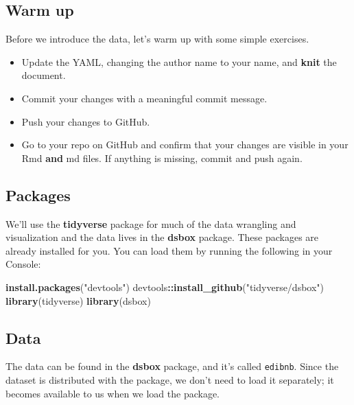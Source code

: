 \documentclass[
]{article}
\newenvironment{Shaded}{\begin{snugshade}}{\end{snugshade}}
\newcommand{\FunctionTok}[1]{\textcolor[rgb]{0.13,0.29,0.53}{\textbf{#1}}}
\newcommand{\NormalTok}[1]{#1}
\newcommand{\SpecialCharTok}[1]{\textcolor[rgb]{0.81,0.36,0.00}{\textbf{#1}}}
\newcommand{\StringTok}[1]{\textcolor[rgb]{0.31,0.60,0.02}{#1}}
\providecommand{\tightlist}{%
  \setlength{\itemsep}{0pt}\setlength{\parskip}{0pt}}
\begin{document}
\subsection{Warm up}\label{warm-up}

Before we introduce the data, let's warm up with some simple exercises.

\begin{itemize}
\tightlist
\item
  Update the YAML, changing the author name to your name, and
  \textbf{knit} the document.
\item
  Commit your changes with a meaningful commit message.
\item
  Push your changes to GitHub.
\item
  Go to your repo on GitHub and confirm that your changes are visible in
  your Rmd \textbf{and} md files. If anything is missing, commit and
  push again.
\end{itemize}

\subsection{Packages}\label{packages}

We'll use the \textbf{tidyverse} package for much of the data wrangling
and visualization and the data lives in the \textbf{dsbox} package.
These packages are already installed for you. You can load them by
running the following in your Console:

\begin{Shaded}
\begin{Highlighting}[]
\FunctionTok{install.packages}\NormalTok{(}\StringTok{"devtools"}\NormalTok{)}
\NormalTok{devtools}\SpecialCharTok{::}\FunctionTok{install\_github}\NormalTok{(}\StringTok{"tidyverse/dsbox"}\NormalTok{)}
\FunctionTok{library}\NormalTok{(tidyverse)}
\FunctionTok{library}\NormalTok{(dsbox)}
\end{Highlighting}
\end{Shaded}

\subsection{Data}\label{data}

The data can be found in the \textbf{dsbox} package, and it's called
\texttt{edibnb}. Since the dataset is distributed with the package, we
don't need to load it separately; it becomes available to us when we
load the package.
\end{document}
